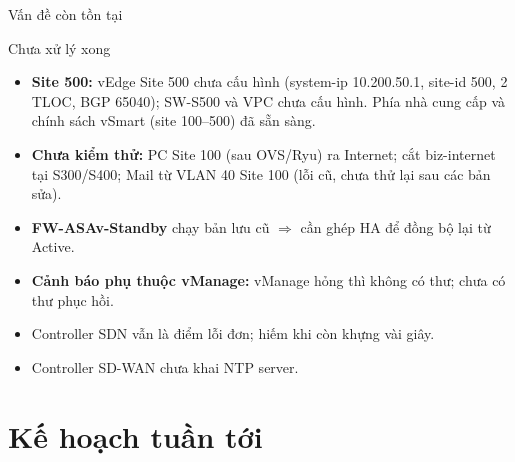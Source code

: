 \documentclass[aspectratio=169, 10pt]{beamer}
\begin{document}
\begin{frame}{Vấn đề còn tồn tại}
    \begin{alertblock}{Chưa xử lý xong}
        \begin{itemize}
            \item \textbf{Site 500:} vEdge Site 500 chưa cấu hình (system-ip 10.200.50.1, site-id 500, 2 TLOC, BGP 65040);
                  SW-S500 và VPC chưa cấu hình. Phía nhà cung cấp và chính sách vSmart (site 100--500) đã sẵn sàng.
            \item \textbf{Chưa kiểm thử:} PC Site 100 (sau OVS/Ryu) ra Internet; cắt biz-internet tại S300/S400;
                  Mail từ VLAN 40 Site 100 (lỗi cũ, chưa thử lại sau các bản sửa).
            \item \textbf{FW-ASAv-Standby} chạy bản lưu cũ $\Rightarrow$ cần ghép HA để đồng bộ lại từ Active.
            \item \textbf{Cảnh báo phụ thuộc vManage:} vManage hỏng thì không có thư; chưa có thư phục hồi.
            \item Controller SDN vẫn là điểm lỗi đơn; hiếm khi còn khựng vài giây.
            \item Controller SD-WAN chưa khai NTP server.
        \end{itemize}
    \end{alertblock}
\end{frame}

\section{Kế hoạch tuần tới}
\end{document}
